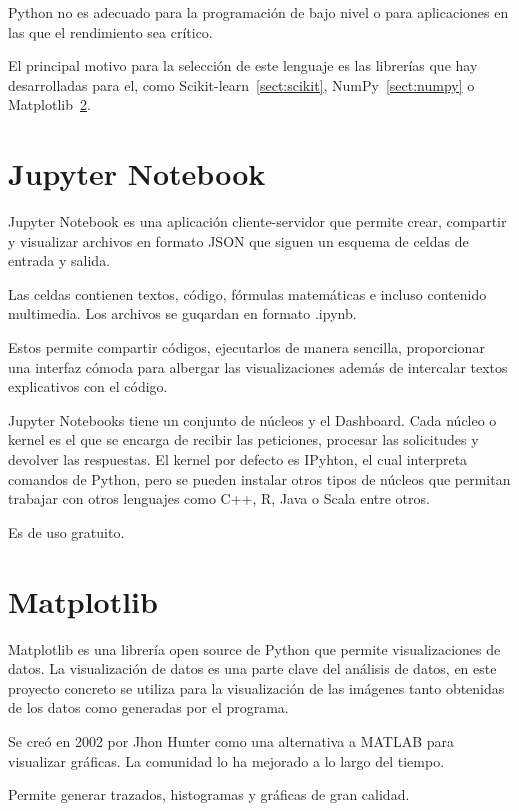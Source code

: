 Python no es adecuado para la programación de bajo nivel o para aplicaciones en las que el rendimiento sea crítico.

El principal motivo para la selección de este lenguaje es las librerías que hay desarrolladas para el, como Scikit-learn~\ref{sect:scikit}, NumPy~\ref{sect:numpy} o Matplotlib~\ref{sect:matplotlib}.

\section{Jupyter Notebook}

Jupyter Notebook \cite{ionosJupyterNotebook} es una aplicación cliente-servidor que permite crear, compartir y visualizar archivos en formato JSON que siguen un esquema de celdas de entrada y salida.

Las celdas contienen textos, código, fórmulas matemáticas e incluso contenido multimedia. Los archivos se guqardan en formato .ipynb.

Estos permite compartir códigos, ejecutarlos de manera sencilla, proporcionar una interfaz cómoda para albergar las visualizaciones además de intercalar textos explicativos con el código.

Jupyter Notebooks tiene un conjunto de núcleos y el Dashboard. Cada núcleo o kernel es el que se encarga de recibir las peticiones, procesar las solicitudes y devolver las respuestas. El kernel por defecto es IPyhton, el cual interpreta comandos de Python, pero se pueden instalar otros tipos de núcleos que permitan trabajar con otros lenguajes como C++, R, Java o Scala entre otros.

Es de uso gratuito.

\section{Matplotlib}\label{sect:matplotlib}

Matplotlib \cite{datascientestMatplotlibTodo} es una librería open source de Python que permite visualizaciones de datos. La visualización de datos es una parte clave del análisis de datos, en este proyecto concreto se utiliza para la visualización de las imágenes tanto obtenidas de los datos como generadas por el programa.

Se creó en 2002 por Jhon Hunter como una alternativa a MATLAB para visualizar gráficas. La comunidad lo ha mejorado a lo largo del tiempo. 

Permite generar trazados, histogramas y gráficas de gran calidad. 

